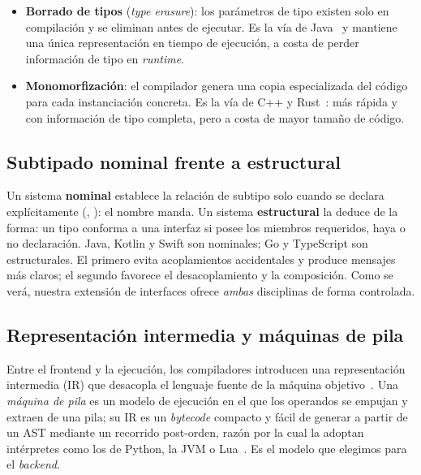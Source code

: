\documentclass[14pts,runningheads,a4paper]{llncs}
\newcommand{\code}[1]{\texttt{\detokenize{#1}}}
\begin{document}
\begin{itemize}
  \item \textbf{Borrado de tipos} (\emph{type erasure}): los par\'ametros de tipo
        existen solo en compilaci\'on y se eliminan antes de ejecutar. Es la v\'ia de
        Java~\cite{bracha1998gj} y mantiene una \'unica representaci\'on en tiempo de
        ejecuci\'on, a costa de perder informaci\'on de tipo en \emph{runtime}.
  \item \textbf{Monomorfizaci\'on}: el compilador genera una copia especializada del
        c\'odigo para cada instanciaci\'on concreta. Es la v\'ia de C++ y
        Rust~\cite{klabnik2023rust}: m\'as r\'apida y con informaci\'on de tipo
        completa, pero a costa de mayor tama\~no de c\'odigo.
\end{itemize}

\subsection{Subtipado nominal frente a estructural}

Un sistema \textbf{nominal} establece la relaci\'on de subtipo solo cuando se declara
expl\'icitamente (\code{implements}, \code{extends}): el nombre manda. Un sistema
\textbf{estructural} la deduce de la forma: un tipo conforma a una interfaz si posee
los miembros requeridos, haya o no declaraci\'on. Java, Kotlin y Swift son
nominales; Go y TypeScript son estructurales. El primero evita acoplamientos
accidentales y produce mensajes m\'as claros; el segundo favorece el desacoplamiento
y la composici\'on. Como se ver\'a, nuestra extensi\'on de interfaces ofrece
\emph{ambas} disciplinas de forma controlada.

\subsection{Representaci\'on intermedia y m\'aquinas de pila}

Entre el frontend y la ejecuci\'on, los compiladores introducen una representaci\'on
intermedia (IR) que desacopla el lenguaje fuente de la m\'aquina
objetivo~\cite{appel1998modern}. Una \emph{m\'aquina de pila} es un modelo de
ejecuci\'on en el que los operandos se empujan y extraen de una pila; su IR es un
\emph{bytecode} compacto y f\'acil de generar a partir de un AST mediante un recorrido
post-orden, raz\'on por la cual la adoptan int\'erpretes como los de Python, la JVM o
Lua~\cite{nystrom2021crafting}. Es el modelo que elegimos para el \emph{backend}.
\end{document}
